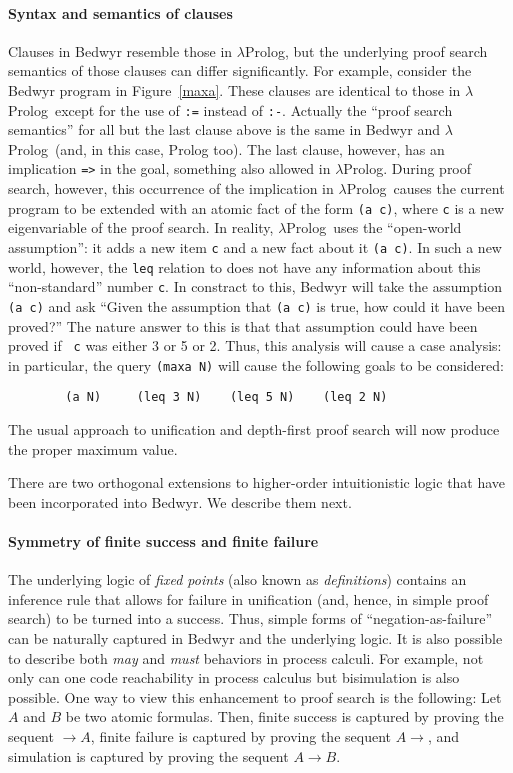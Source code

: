 \documentclass{article}
\newcommand{\lp}{$\lambda$Prolog}
\begin{document}
\paragraph{Syntax and semantics of clauses}
Clauses in Bedwyr resemble those in \lp, but the underlying proof
search semantics of those clauses can differ significantly.  For example,
consider the Bedwyr program in Figure~\ref{maxa}.  These clauses are
identical to those in \lp\ except for the use of \verb+:=+ instead of
\verb+:-+.  Actually the ``proof search semantics'' for all but the
last clause above is the same in Bedwyr and \lp\ (and, in this case,
Prolog too).  The last clause, however, has an implication \verb+=>+
in the goal, something also allowed in \lp.  During proof search,
however, this occurrence of the implication in \lp\ causes the current
program to be extended with an atomic fact of the form \verb+(a c)+,
where {\tt c} is a new eigenvariable of the proof search.  In reality,
\lp\ uses the ``open-world assumption'': it adds a new item {\tt c}
and a new fact about it {\tt (a c)}.  In such a new world, however, the 
{\tt leq} relation to does not have any information about this
``non-standard'' number {\tt c}.  In constract to this, Bedwyr will
take the assumption  {\tt (a c)} and ask ``Given the assumption that 
{\tt (a c)} is true, how could it have been proved?''  The nature
answer to this is that that assumption could have been proved if {\tt
c} was either 3 or 5 or 2.  Thus, this analysis will cause a case
analysis: in particular, the query {\tt (maxa N)} will cause the
following goals to be considered:
\begin{verbatim}
        (a N)     (leq 3 N)    (leq 5 N)    (leq 2 N)
\end{verbatim}
The usual approach to unification and depth-first proof search will
now produce the proper maximum value.

\bigskip
There are two orthogonal extensions to higher-order intuitionistic
logic that have been incorporated into Bedwyr.   We describe them next.

\paragraph{Symmetry of finite success and finite failure}
The underlying logic of {\em fixed points} (also known as {\em
definitions})
\cite{girard92mail,schroeder-Heister93lics,mcdowell03tcs,momigliano03types}
contains an inference rule that allows for failure in unification
(and, hence, in simple proof search) to be turned into a success.
Thus, simple forms of ``negation-as-failure'' can be naturally
captured in Bedwyr and the underlying logic.  It is also possible to
describe both {\em may} and {\em must} behaviors in process calculi.
For example, not only can one code reachability in process calculus
but bisimulation is also possible.  One way to view this enhancement
to proof search is the following: Let $A$ and $B$ be two atomic
formulas.  Then, finite success is captured by proving the sequent
$\longrightarrow A$, finite failure is captured by proving the sequent
$A\longrightarrow$, and simulation is captured by proving the sequent
$A\longrightarrow B$.
\end{document}
